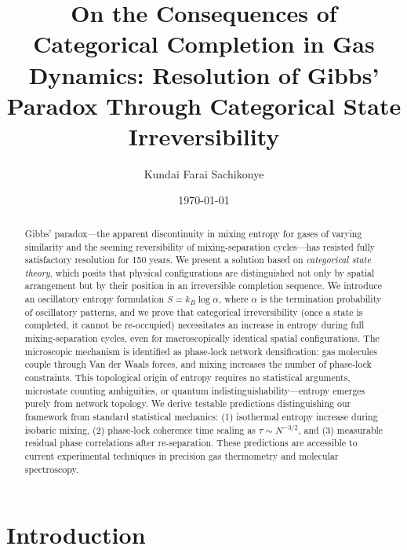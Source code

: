 \documentclass[superscriptaddress,prb,10pt]{revtex4-2}
\theoremstyle{definition}
\theoremstyle{remark}
\begin{document}
\title{On the Consequences of Categorical Completion in Gas Dynamics: Resolution of Gibbs' Paradox Through Categorical State Irreversibility}

\author{Kundai Farai Sachikonye}

\date{\today}

\begin{abstract}
Gibbs' paradox—the apparent discontinuity in mixing entropy for gases of varying similarity and the seeming reversibility of mixing-separation cycles—has resisted fully satisfactory resolution for 150 years. We present a solution based on \emph{categorical state theory}, which posits that physical configurations are distinguished not only by spatial arrangement but by their position in an irreversible completion sequence. We introduce an oscillatory entropy formulation $S = k_B \log \alpha$, where $\alpha$ is the termination probability of oscillatory patterns, and we prove that categorical irreversibility (once a state is completed, it cannot be re-occupied) necessitates an increase in entropy during full mixing-separation cycles, even for macroscopically identical spatial configurations. The microscopic mechanism is identified as phase-lock network densification: gas molecules couple through Van der Waals forces, and mixing increases the number of phase-lock constraints. This topological origin of entropy requires no statistical arguments, microstate counting ambiguities, or quantum indistinguishability—entropy emerges purely from network topology. We derive testable predictions distinguishing our framework from standard statistical mechanics: (1) isothermal entropy increase during isobaric mixing, (2) phase-lock coherence time scaling as $\tau \sim N^{-3/2}$, and (3) measurable residual phase correlations after re-separation. These predictions are accessible to current experimental techniques in precision gas thermometry and molecular spectroscopy.
\end{abstract}


\maketitle

\section{Introduction}
\end{document}
